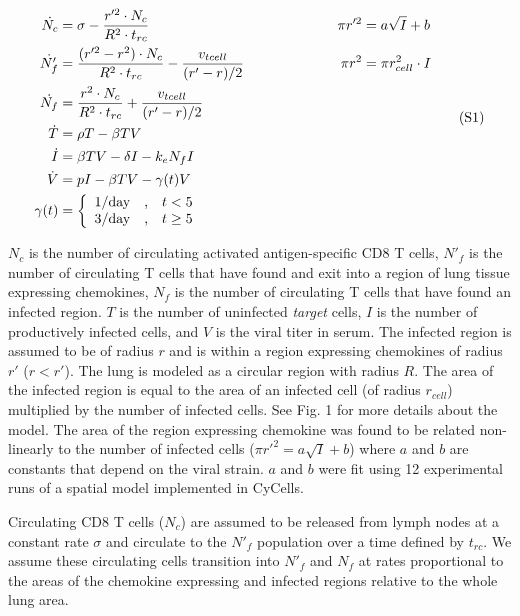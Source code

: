 \documentclass[10pt]{article}
\begin{document}
{\footnotesize
\begin{equation*}
\label{EqS1}
\begin{aligned}
\dot{N_{c}} &= \sigma - \frac{r'^{2} \cdot N_{c}}{R^{2} \cdot t_{rc}} & \pi r'^{2} &= a \sqrt{I} + b \\
\dot{N'_{f}} &= \frac{(r'^{2} - r^{2}) \cdot N_{c}}{R^{2} \cdot t_{rc}} - \frac{v_{tcell}}{(r' - r) / 2} \hspace*{2cm}  & \pi r^{2} &= \pi r_{cell}^{2} \cdot I \\
\dot{N_{f}} &= \frac{r^{2} \cdot N_{c}}{R^{2} \cdot t_{rc}} + \frac{v_{tcell}}{(r' - r) / 2} \\
\dot{T} &= \rho T -\beta TV \\
\dot{I} &= \beta TV - \delta I - k_{e} N_{f} I \\
\dot{V} &= pI - \beta TV - \gamma (t) V \\
\gamma (t) &= \left\{ \begin{array}{rcl}
	1/\mbox{day} & \mbox{,}  & t < 5  \\
	3/\mbox{day} & \mbox{,} & t \geq 5  
	\end{array}\right. \\
\end{aligned}
\tag{S1}
\end{equation*}
}
\vspace{0.5in}


$N_{c}$ is the number of circulating activated antigen-specific CD8 T cells, $N'_{f}$ is the number of circulating T cells that have found and exit into a region of lung tissue expressing chemokines, $N_{f}$ is the number of circulating T cells that have found an infected region. $T$ is the number of uninfected \textit{target} cells, $I$ is the number of productively infected cells, and $V$ is the viral titer in serum. The infected region is assumed to be of radius $r$ and is within a region expressing chemokines of radius $r'$ ($r  < r'$). The lung is modeled as a circular region with radius $R$. The area of the infected region is equal to the area of an infected cell (of radius $r_{cell}$) multiplied by the number of infected cells. See Fig. 1 for more details about the model.  The area of the region expressing chemokine was found to be related non-linearly to the number of infected cells ($\pi r'^{2} = a \sqrt{I} + b$) where $a$ and $b$ are constants that depend on the viral strain.  $a$ and $b$ were fit using 12 experimental runs of a spatial model implemented in CyCells.

Circulating CD8 T cells ($N_{c}$) are assumed to be released from lymph nodes at a constant rate $\sigma$ and circulate to the $N'_{f}$ population over a time defined by $t_{rc}$. We assume these circulating cells transition into $N'_{f}$ and $N_{f}$ at rates proportional to the areas of the chemokine expressing and infected regions relative to the whole lung area. 
\end{document}
